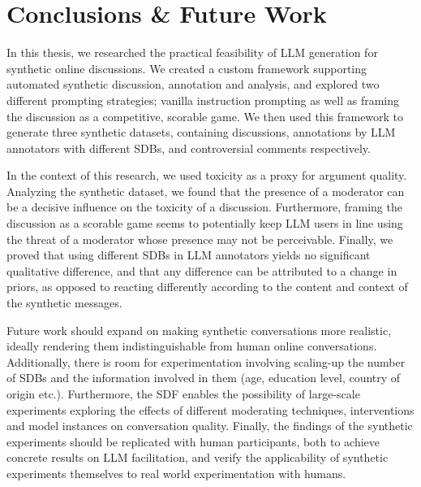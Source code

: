 %
\chapter{Conclusions \& Future Work}
\label{sec:conclusions}

In this thesis, we researched the practical feasibility of LLM generation for synthetic online discussions. We created a custom framework supporting automated synthetic discussion, annotation and analysis, and explored two different prompting strategies; vanilla instruction prompting as well as framing the discussion as a competitive, scorable game. We then used this framework to generate three synthetic datasets, containing discussions, annotations by LLM annotators with different \acp{SDB}, and controversial comments respectively. 

In the context of this research, we used toxicity as a proxy for argument quality. Analyzing the synthetic dataset, we found that the presence of a moderator can be a decisive influence on the toxicity of a discussion. Furthermore, framing the discussion as a scorable game seems to potentially keep LLM users in line using the threat of a moderator whose presence may not be perceivable. Finally, we proved that using different SDBs in LLM annotators yields no significant qualitative difference, and that any difference can be attributed to a change in priors, as opposed to reacting differently according to the content and context of the synthetic messages.

Future work should expand on making synthetic conversations more realistic, ideally rendering them indistinguishable from human online conversations. Additionally, there is room for experimentation involving scaling-up the number of SDBs and the information involved in them (age, education level, country of origin etc.). Furthermore, the \ac{SDF} enables the possibility of large-scale experiments exploring the effects of different moderating techniques, interventions and model instances on conversation quality. Finally, the findings of the synthetic experiments should be replicated with human participants, both to achieve concrete results on LLM facilitation, and verify the applicability of synthetic experiments themselves to real world experimentation with humans.

